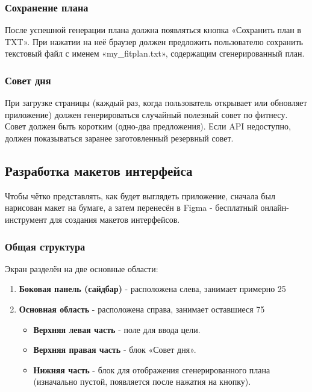 \documentclass[14pt, a4paper]{extarticle}
\begin{document}
\begin{enumerate}
\subsubsection{Сохранение плана}

\noindent После успешной генерации плана должна появляться кнопка «Сохранить план в TXT». При нажатии на неё браузер должен предложить пользователю сохранить текстовый файл с именем «my_fitplan.txt», содержащим сгенерированный план.
\vskip 5cm
\subsubsection{Совет дня}

\noindent При загрузке страницы (каждый раз, когда пользователь открывает или обновляет приложение) должен генерироваться случайный полезный совет по фитнесу. Совет должен быть коротким (одно-два предложения). Если API недоступно, должен показываться заранее заготовленный резервный совет.

\subsection{Разработка макетов интерфейса}

\noindent Чтобы чётко представлять, как будет выглядеть приложение, сначала был нарисован макет на бумаге, а затем перенесён в Figma - бесплатный онлайн-инструмент для создания макетов интерфейсов.

\subsubsection{Общая структура}

\noindent Экран разделён на две основные области:

\begin{enumerate}
\item \textbf{Боковая панель (сайдбар)} - расположена слева, занимает примерно 25%

\item \textbf{Основная область} - расположена справа, занимает оставшиеся 75%
\begin{itemize}
\item \textbf{Верхняя левая часть} - поле для ввода цели.
\item \textbf{Верхняя правая часть} - блок «Совет дня».
\item \textbf{Нижняя часть} - блок для отображения сгенерированного плана (изначально пустой, появляется после нажатия на кнопку).
\end{itemize}
\end{enumerate}


\end{enumerate}
\end{document}
